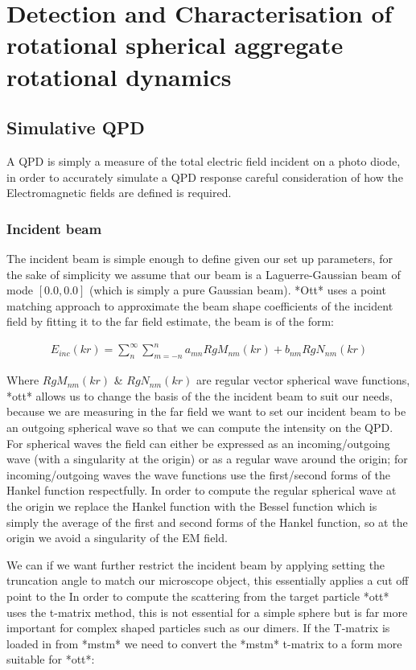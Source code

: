 \chapter{Detection and Characterisation of rotational spherical aggregate rotational dynamics}
\section{Simulative QPD}
A QPD is simply a measure of the total electric field incident on a photo diode, in order to accurately simulate a QPD response careful consideration of how the Electromagnetic fields are defined is required. 

\subsection{Incident beam}
\label{sec:scattering}
The incident beam is simple enough to define given our set up parameters, for the sake of simplicity we assume that our beam is a Laguerre-Gaussian beam of mode $[0.0, 0.0]$ (which is simply a pure Gaussian beam). *Ott* uses a point matching approach to approximate the beam shape coefficients of the incident field by fitting it to the far field estimate, the beam is of the form:

\begin{align}
	E_{inc}(kr)=\sum^\infty_n\sum^n_{m=-n}a_{mn}RgM_{nm}(kr)+b_{nm}RgN_{nm}(kr)
\end{align}

Where $RgM_{nm}(kr)$ \& $RgN_{nm}(kr)$ are regular vector spherical wave functions, *ott* allows us to change the basis of the the incident beam to suit our needs, because we are measuring in the far field we want to set our incident beam to be an outgoing spherical wave so that we can compute the intensity on the QPD. For spherical waves the field can either be expressed as an incoming/outgoing wave (with a singularity at the origin) or as a regular wave around the origin; for incoming/outgoing waves the wave functions use the first/second forms of the Hankel function respectfully. In order to compute the regular spherical wave at the origin we replace the Hankel function with the Bessel function which is simply the average of the first and second forms of the Hankel function, so at the origin we avoid a singularity of the EM field.  

We can if we want further restrict the incident beam by applying setting the truncation angle to match our microscope object, this essentially applies a cut off point to the In order to compute the scattering from the target particle *ott* uses the t-matrix method, this is not essential for a simple sphere but is far more important for complex shaped particles such as our dimers. If the T-matrix is loaded in from *mstm* we need to convert the *mstm* t-matrix to a form more suitable for *ott*:

